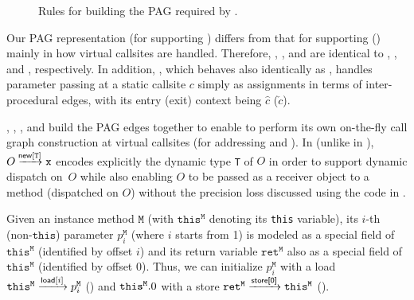 \begin{figure}[t]
\begin{center}
\begin{tabular}{c}
		\end{tabular}
	\end{center}
	\caption{Rules for building the PAG required by \LFCR.
	\label{fig:newcflpag}}
\end{figure}

Our PAG representation (for supporting \LFCR) differs from that for supporting
\manuLFC
() mainly in  how virtual callsites are handled. Therefore,
, , and  
are identical to , , and ,
 respectively. In addition, , which behaves also identically as , handles parameter passing at a static callsite $c$  simply as assignments
 in terms of 
 inter-procedural \assign edges, with its entry (exit) context being 
 $\hat{c}$ ($\check{c}$).
 



,
,
, and
 build the PAG edges together to enable \LFCR to perform its own on-the-fly call graph construction at virtual callsites (for addressing  and ).
In  (unlike  in ), $O \xrightarrow{\!\!\textsf{new}[\texttt{T}]\!\!} \mathtt{x}$ encodes  explicitly the dynamic
 type \texttt{T} of $O$  in order to support dynamic dispatch on~$O$ while
 also enabling $O$ to be passed as a receiver object to a method (dispatched
 on $O$)
 without the precision loss discussed using the code in 
 .

Given an instance method $\mathtt{M}$
(with $\texttt{this}^\mathtt{M}$ denoting its \texttt{this} variable),
its  $i$-th  (non-$\texttt{this}$) parameter $p_{i}^{\mathtt{M}}$  (where $i$ starts from 1)
is modeled as a
 special field of  $\texttt{this}^\mathtt{M}$ (identified by   offset $i$) and
its return variable $\mathtt{ret}^\mathtt{M}$ also  as a
 special field of  $\texttt{this}^\mathtt{M}$ (identified by  offset 0).
Thus, we can initialize $p_{i}^{\mathtt{M}}$  with a load
 $\mathtt{this}^{\mathtt{M}} \xrightarrow{\textsf{load}[i]} p_{i}^{\mathtt{M}}$
 () 
 and $\mathtt{this}^\mathtt{M}.0$ with a store
 $\mathtt{ret}^\mathtt{M}  \xrightarrow{\textsf{store[0]}} \mathtt{this}^{\mathtt{M}}$
 ().
 

